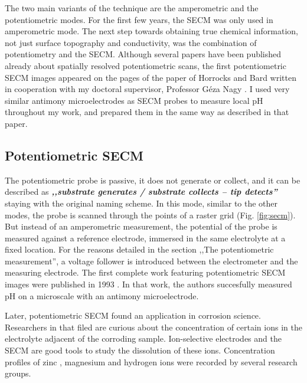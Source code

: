 The two main variants of the technique are the amperometric and the potentiometric modes.
For the first few years, the SECM was only used in amperometric mode.
The next step towards obtaining true chemical information, not just surface topography and conductivity, was the combination of potentiometry and the SECM.
Although several papers have been published already about spatially resolved potentiometric scans, the first potentiometric SECM images appeared on the pages of the paper of Horrocks and Bard written in cooperation with my doctoral supervisor, Professor Géza Nagy \cite{horrocks1993scanning}.
I used very similar antimony microelectrodes as SECM probes to measure local pH throughout my work, and prepared them in the same way as described in that paper. 

\subsection{Potentiometric SECM}
The potentiometric probe is passive, it does not generate or collect, and it can be described as \textbf{\emph{,,substrate generates / substrate collects -- tip detects''}} staying with the original naming scheme.
In this mode, similar to the other modes, the probe is scanned through the points of a raster grid (Fig. \ref{fig:secm}).
But instead of an amperometric measurement, the potential of the probe is measured against a reference electrode, immersed in the same electrolyte at a fixed location.
For the reasons detailed in the section ,,The potentiometric measurement'', a voltage follower is introduced between the electrometer and the measuring electrode.
The first complete work featuring potentiometric SECM images were published in 1993 \cite{horrocks1993scanning}.
In that work, the authors succesfully measured pH on a microscale with an antimony microelectrode. 

Later, potentiometric SECM found an application in corrosion science.
Researchers in that filed are curious about the concentration of certain ions in the electrolyte adjacent of the corroding sample.
Ion-selective electrodes and the SECM are good tools to study the dissolution of these ions.
Concentration profiles of zinc \cite{bastos2010micropotentiometric}, magnesium \cite{lamaka2008monitoring, lamaka2009novel, karavai2010localized} and hydrogen ions \cite{lamaka2008monitoring} were recorded by several research groups.

